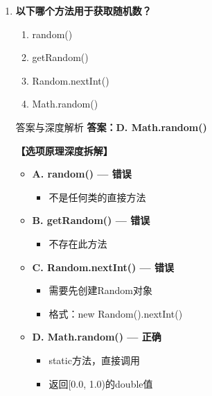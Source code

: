 \documentclass[12pt, a4paper]{ctexart}
\begin{document}
\begin{enumerate}[label=\textbf{\arabic*.}]
	      \vspace{1em}

	\item \textbf{以下哪个方法用于获取随机数？}
	      \begin{enumerate}[label=\Alph*.]
		      \item random()
		      \item getRandom()
		      \item Random.nextInt()
		      \item Math.random()
	      \end{enumerate}

	      \begin{bluebox}{答案与深度解析}
		      \textbf{答案：D. Math.random()}

		      \textbf{【选项原理深度拆解】}
					  \begin{itemize}[label={}, leftmargin=*, nosep]


		      \item \textbf{A. random() — 错误}
					  \begin{itemize}[label={}, nosep]
		      
			      \item 不是任何类的直接方法
		      

					  \end{itemize}
		      \item \textbf{B. getRandom() — 错误}
					  \begin{itemize}[label={}, nosep]
		      
			      \item 不存在此方法
		      

					  \end{itemize}
		      \item \textbf{C. Random.nextInt() — 错误}
					  \begin{itemize}[label={}, nosep]
		      
			      \item 需要先创建Random对象
			      \item 格式：new Random().nextInt()
		      

					  \end{itemize}
		      \item \textbf{D. Math.random() — 正确}
					  \begin{itemize}[label={}, nosep]
		      
			      \item static方法，直接调用
			      \item 返回[0.0, 1.0)的double值
		      


\end{itemize}
\end{itemize}
\end{bluebox}
\end{enumerate}
\end{document}
